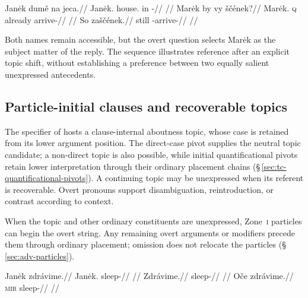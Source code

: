 \pex\label{ex:tc-topic-reintroduction}
\a
\begingl
\gla Janėk dumě na jeca.//
\glb Janėk.\Dir{} house.\Ind{} in \Exst{}-\Cont{}//
\glft {}
//
\endgl
\a
\begingl
\gla Marėk by vy ščének?//
\glb Marėk.\Dir{} \textsc{q} already arrive-\Pf{}//
\glft {}
//
\endgl
\a
\begingl
\gla So zaščének.//
\glb still \Neg{}-arrive-\Pf{}//
\glft {}
//
\endgl
\xe

Both names remain accessible, but the overt question selects Marėk as the
subject matter of the reply. The sequence illustrates reference after an
explicit topic shift, without establishing a preference between two equally
salient unexpressed antecedents.

\subsection{Particle-initial clauses and recoverable topics}
\label{sec:th-topic}

The specifier of  hosts a clause-internal aboutness topic,
 whose case is retained from its lower argument position. The direct-case
 pivot supplies the neutral topic candidate; a non-direct topic is also
 possible, while initial quantificational pivots retain lower interpretation
 through their ordinary placement chains
 (§\,\ref{sec:tc-quantificational-pivots}). A continuing topic may be
 unexpressed when its referent is recoverable. Overt pronouns support
 disambiguation, reintroduction, or contrast according to context.

When the topic and other ordinary constituents are unexpressed,
Zone~\textsc{i} particles can begin the overt string. Any remaining overt
arguments or modifiers precede them through ordinary placement; omission
does not relocate the particles
(§\,\ref{sec:adv-particles}).

\pex
\a
\begingl
\gla Janėk zdrávime.//
\glb Janėk.\Dir{} sleep-\Prog{}//
\glft {} //
\endgl
\a
\begingl
\gla Zdrávime.//
\glb sleep-\Prog{}//
\glft {} //
\endgl
\a
\begingl
\gla Oče zdrávime.//
\glb \textsc{mir} sleep-\Prog{}//
\glft {} //
\endgl
\xe

